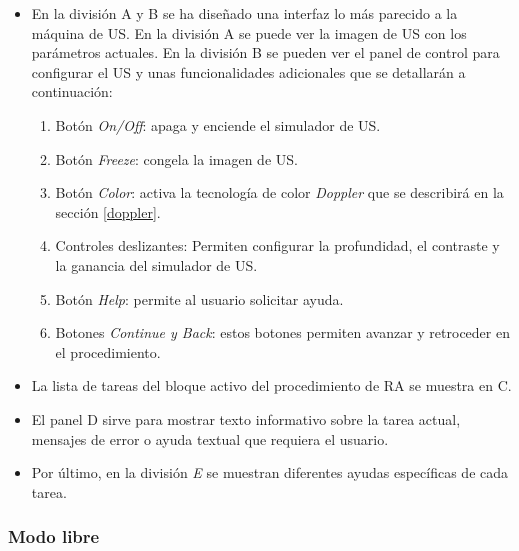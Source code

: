 \begin{itemize}
    \item En la división A y B se ha diseñado una interfaz lo más parecido a la máquina de \ac{US}.%
     En la división A se puede ver la imagen de \ac{US} con los parámetros actuales. En la división B se pueden ver el panel de control para configurar el \ac{US} y unas funcionalidades adicionales que se detallarán a continuación:
    \begin{enumerate}
        
        \item Botón \emph{On/Off}: apaga y enciende el simulador de \ac{US}.
        \item Botón \emph{Freeze}: congela la imagen de \ac{US}.
 \item Botón \emph{Color}: activa la tecnología de color \emph{Doppler} que se describirá en la sección \ref{doppler}.
\item Controles deslizantes: Permiten configurar la profundidad, el contraste y la ganancia del simulador de \ac{US}.
        \item Botón \emph{Help}: permite al usuario solicitar ayuda.
        \item Botones \emph{Continue y Back}: estos botones  permiten avanzar y retroceder en el procedimiento. 
    \end{enumerate}
    \item La lista de tareas del bloque activo del procedimiento de \ac{RA} se muestra en C.
    \item El panel D sirve para mostrar texto informativo sobre la tarea actual, mensajes de error o ayuda textual que requiera el usuario.
    \item Por último, en la división \emph{E} se muestran diferentes ayudas específicas de cada tarea.
\end{itemize}





\subsubsection{Modo libre}

